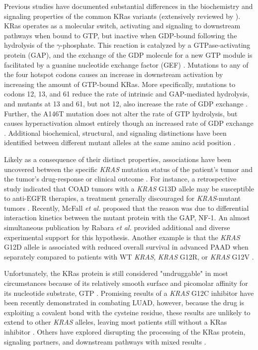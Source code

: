 \documentclass[english, 12pt, letterpaper]{article}
\newcommand{\KRAS}{\emph{KRAS}}
\newcommand{\kras}{KRas}
\begin{document}
Previous studies have documented substantial differences in the biochemistry and signaling properties of the common \kras{} variants (extensively reviewed by \cite{Miller2012, Li2018}).
\kras{} operates as a molecular switch, activating and signaling to downstream pathways when bound to GTP, but inactive when GDP-bound following the hydrolysis of the $\gamma$-phosphate.
This reaction is catalyzed by a GTPase-activating protein (GAP), and the exchange of the GDP molecule for a new GTP module is facilitated by a guanine nucleotide exchange factor (GEF) \cite{Barbacid1987}.
Mutations to any of the four hotspot codons causes an increase in downstream activation by increasing the amount of GTP-bound \kras{}.
More specifically, mutations to codons 12, 13, and 61 reduce the rate of intrinsic and GAP-mediated hydrolysis, and mutants at 13 and 61, but not 12, also increase the rate of GDP exchange \cite{Hunter2015a, Smith2013}.
Further, the A146T mutation does not alter the rate of GTP hydrolysis, but causes hyperactivation almost entirely though an increased rate of GDP exchange \cite{Edkins2006, Janakiraman2010, Poulin2019}.
Additional biochemical, structural, and signaling distinctions have been identified between different mutant alleles at the same amino acid position \cite{Poulin2019, Hobbs2019AtypicalCancer., Hunter2015a, Li2018, Yu2018, Kovalski2019, Ihle2012, Spoerner2004, Smith2014a, Pantsar2018}.

Likely as a consequence of their distinct properties, associations have been uncovered between the specific \KRAS{} mutation status of the patient's tumor and the tumor's drug-response or clinical outcome \cite{Haigis2017, Li2018}.
For instance, a retrospective study indicated that COAD tumors with a \KRAS{} G13D allele may be susceptible to anti-EGFR therapies, a treatment generally discouraged for \KRAS{}-mutant tumors \cite{DeRoock2010}. 
Recently, McFall \emph{et al.} \cite{McFall2019} proposed that the reason was due to differential interaction kinetics between the mutant protein with the GAP, NF-1.
An almost simultaneous publication by Rabara \emph{et al.} \cite{Rabara2019} provided additional and diverse experimental support for this hypothesis.
Another example is that the \KRAS{} G12D allele is associated with reduced overall survival in advanced PAAD when separately compared to patients with WT \KRAS{}, \KRAS{} G12R, or \KRAS{} G12V \cite{Bournet2016}.

Unfortunately, the \kras{} protein is still considered "undruggable" in most circumstances because of its relatively smooth surface and picomolar affinity for its nucleotide substrate, GTP \cite{Spencer-Smith2019}.
Promising results of a \KRAS{} G12C inhibitor have been recently demonstrated in combating LUAD, however, because the drug is exploiting a covalent bond with the cysteine residue, these results are unlikely to extend to other \KRAS{} alleles, leaving most patients still without a \kras{} inhibitor \cite{Lim2014,Ostrem2013, Patricelli2016, Lito2016, Canon2019}.
Others have explored disrupting the processing of the \kras{} protein, signaling partners, and downstream pathways with mixed results \cite{Spencer-Smith2019, Zeitouni2016}.
\end{document}

